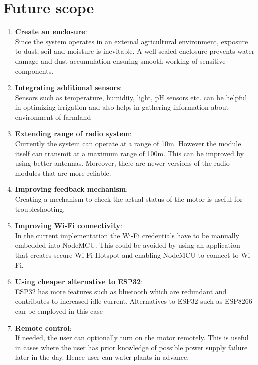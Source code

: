 \section{Future scope}
\begin{enumerate}
  \item \textbf{Create an enclosure}: \\
    Since the system operates in an external agricultural
    environment, exposure to    dust, soil and moisture is
    inevitable. A well sealed-enclosure prevents water damage and
    dust accumulation ensuring smooth working of sensitive components.
  \item \textbf{Integrating additional sensors}: \\
    Sensors such as temperature, humidity, light, pH sensors etc. can
    be helpful in optimizing irrigation and also helps in
    gathering information about environment of farmland
  \item \textbf{Extending range of radio system}: \\
    Currently the system can operate at a range of 10m. However the module itself can transmit at a maximum range of 100m. This can be improved by using better antennas. Moreover, there are newer versions of the radio modules that are more reliable.
  \item \textbf{Improving feedback mechanism}: \\
    Creating a mechanism to check the actual status of the motor is useful for troubleshooting.
  \item \textbf{Improving Wi-Fi connectivity}: \\
    In the current implementation the Wi-Fi credentials have to be manually embedded into NodeMCU. This could be avoided by using an application that creates secure Wi-Fi Hotspot and enabling NodeMCU to connect to Wi-Fi.	
  \item \textbf{Using cheaper alternative to ESP32}: \\
    ESP32 has more features such as bluetooth which are redundant and contributes to increased idle current. Alternatives to ESP32 such as ESP8266 can be employed in this case
  \item \textbf{Remote control}: \\
    If needed, the user can optionally turn on the motor remotely.
    This is useful in cases where the user has prior knowledge of
    possible power supply failure later in the day. Hence user can
    water plants in advance.
\end{enumerate}
